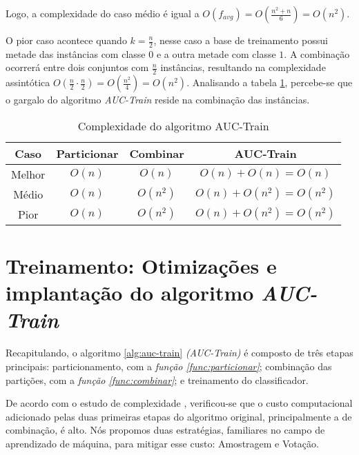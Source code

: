 Logo, a complexidade do caso médio é igual a $O(f_{avg}) = O(\frac{n^2 + n}{6}) = O(n^2)$.

O pior caso acontece quando $k = \frac{n}{2}$, nesse caso a base de treinamento possui metade das instâncias com classe $0$ e a outra metade com classe $1$. A combinação ocorrerá entre dois conjuntos com $\frac{n}{2}$ instâncias, resultando na complexidade assintótica $O(\frac{n}{2} \cdot \frac{n}{2}) = O(\frac{n^2}{4}) = O(n^2)$. Analisando a tabela \ref{auc-train-complexity}, percebe-se que o gargalo do algoritmo \emph{AUC-Train} reside na combinação das instâncias.

\begin{table}[h!]
    \centering
    \begin{tabular}{ c | c c | c }
        \hline

        Caso & Particionar & Combinar & AUC-Train \\

        \hline

        Melhor & $O(n)$ & $O(n)$ & $O(n) + O(n) = O(n)$ \\
        Médio & $O(n)$ & $O(n^2)$ & $O(n) + O(n^2) = O(n^2)$ \\
        Pior  & $O(n)$ & $O(n^2)$ & $O(n) + O(n^2) = O(n^2)$ \\

        \hline
    \end{tabular}

    \caption{Complexidade do algoritmo AUC-Train}
    \label{auc-train-complexity}
\end{table}


\section{Treinamento: Otimizações e implantação do algoritmo \emph{AUC-Train}}

Recapitulando, o algoritmo \ref{alg:auc-train} \emph{(AUC-Train)} é composto de três etapas principais: particionamento, com a \emph{função \ref{func:particionar}}; combinação das partições, com a \emph{função \ref{func:combinar}}; e treinamento do classificador.

De acordo com o estudo de complexidade , verificou-se que o custo computacional adicionado pelas duas primeiras etapas do algoritmo  original, principalmente a de combinação, é alto. Nós propomos duas estratégias, familiares no campo de aprendizado de máquina, para mitigar esse custo: Amostragem e Votação.

